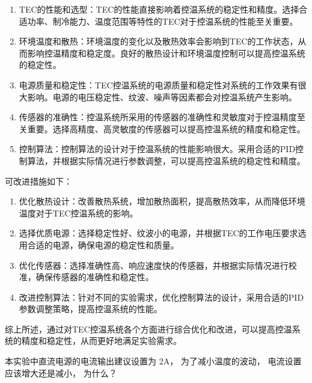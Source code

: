 \documentclass[dvipsnames, svgnames,a4paper,11pt]{article}
\begin{document}
        \begin{enumerate}
            \item TEC的性能和选型：TEC的性能直接影响着控温系统的稳定性和精度。选择合适功率、制冷能力、温度范围等特性的TEC对于控温系统的性能至关重要。
            \item 环境温度和散热：环境温度的变化以及散热效率会影响到TEC的工作状态，从而影响控温精度和稳定度。良好的散热设计和环境温度控制可以提高控温系统的稳定性。
            \item 电源质量和稳定性：TEC控温系统的电源质量和稳定性对系统的工作效果有很大影响。电源的电压稳定性、纹波、噪声等因素都会对控温系统产生影响。
            \item 传感器的准确性：控温系统所采用的传感器的准确性和灵敏度对于控温精度至关重要。选择高精度、高灵敏度的传感器可以提高控温系统的精度和稳定性。
            \item 控制算法：控制算法的设计对于控温系统的性能影响很大。采用合适的PID控制算法，并根据实际情况进行参数调整，可以提高控温系统的稳定性和精度。
        \end{enumerate}
    

    可改进措施如下：
    
        \begin{enumerate}
            \item 优化散热设计：改善散热系统，增加散热面积，提高散热效率，从而降低环境温度对于TEC控温系统的影响。
            \item 选择优质电源：选择稳定性好、纹波小的电源，并根据TEC的工作电压要求选用合适的电源，确保电源的稳定性和质量。
            \item 优化传感器：选择准确性高、响应速度快的传感器，并根据实际情况进行校准，确保传感器的准确性和稳定性。
            \item 改进控制算法：针对不同的实验需求，优化控制算法的设计，采用合适的PID参数调整策略，提高控温系统的性能。
        \end{enumerate}


    综上所述，通过对TEC控温系统各个方面进行综合优化和改进，可以提高控温系统的精度和稳定性，从而更好地满足实验需求。
    


    \begin{question}
        本实验中直流电源的电流输出建议设置为 2A， 为了减小温度的波动， 电流设置应该增大还是减小， 为什么？
    \end{question}
\end{document}
